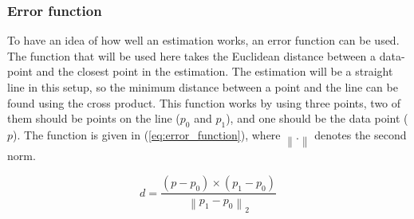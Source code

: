 \subsubsection{Error function}
\label{sec:error_function}
To have an idea of how well an estimation works, an error function can be used. The function that will be used here takes the Euclidean distance between a data-point and the closest point in the estimation. The estimation will be a straight line in this setup, so the minimum distance between a point and the line can be found using the cross product. This function works by using three points, two of them should be points on the line ($p_0$ and $p_1$), and one should be the data point ($p$). The function is given in (\ref{eq:error_function}), where $\left\lVert .\right\rVert$ denotes the second norm. 

\begin{equation}
    \label{eq:error_function}
    d = \frac{(p - p_0) \times (p_1 - p_0)}{\left\lVert p_1 - p_0\right\rVert _2}
\end{equation}